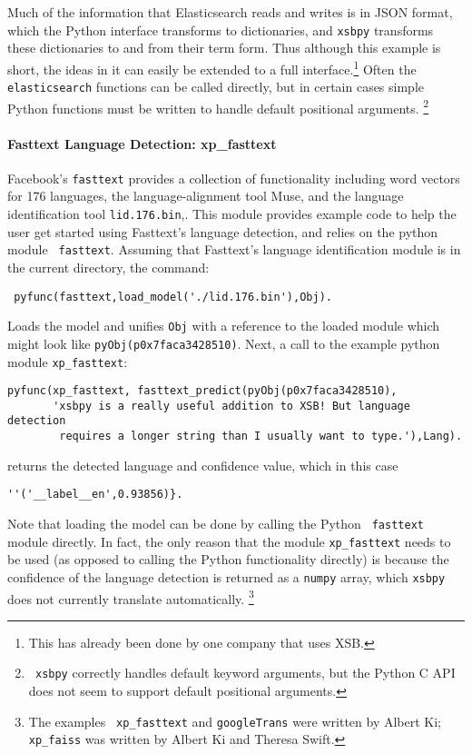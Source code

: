 Much of the information that Elasticsearch reads and writes is in JSON
format, which the Python interface transforms to dictionaries, and
{\tt xsbpy} transforms these dictionaries to and from their term form.
Thus although this example is short, the ideas in it can easily be
extended to a full interface.\footnote{This has already been done by
  one company that uses XSB.}  Often the {\tt elasticsearch} functions
can be called directly, but in certain cases simple Python functions
must be written to handle default positional arguments. \footnote{{\tt
    xsbpy} correctly handles default keyword arguments, but the Python
  C API does not seem to support default positional arguments.}

\paragraph{Fasttext Language Detection: xp\_fasttext}
%
Facebook's {\tt fasttext} provides a collection of functionality
including word vectors for 176 languages, the language-alignment tool
Muse, and the language identification tool {\tt lid.176.bin},.  This
module provides example code to help the user get started using
Fasttext's language detection, and relies on the python module {\tt
  fasttext}.  Assuming that Fasttext's language identification module
is in the current directory, the command:
\begin{verbatim}
 pyfunc(fasttext,load_model('./lid.176.bin'),Obj).
\end{verbatim}
Loads the model and unifies {\tt Obj} with a reference to the loaded
module which might look like {\tt pyObj(p0x7faca3428510)}.  
Next, a call to the example python module {\tt xp\_fasttext}:
\begin{verbatim}
pyfunc(xp_fasttext, fasttext_predict(pyObj(p0x7faca3428510),
       'xsbpy is a really useful addition to XSB! But language detection
        requires a longer string than I usually want to type.'),Lang).  
\end{verbatim}
returns the detected language and confidence value, which in this case

\begin{verbatim}
''('__label__en',0.93856)}.
\end{verbatim}

Note that loading the model can be done by calling the Python {\tt
  fasttext} module directly.  In fact, the only reason that the module
{\tt xp\_fasttext} needs to be used (as opposed to calling the Python
functionality directly) is because the confidence of the language
detection is returned as a {\tt numpy} array, which {\tt xsbpy} does
not currently translate automatically. \footnote{The examples {\tt
    xp\_fasttext} and {\tt googleTrans} were written by Albert Ki;
  {\tt xp\_faiss} was written by Albert Ki and Theresa Swift.}

